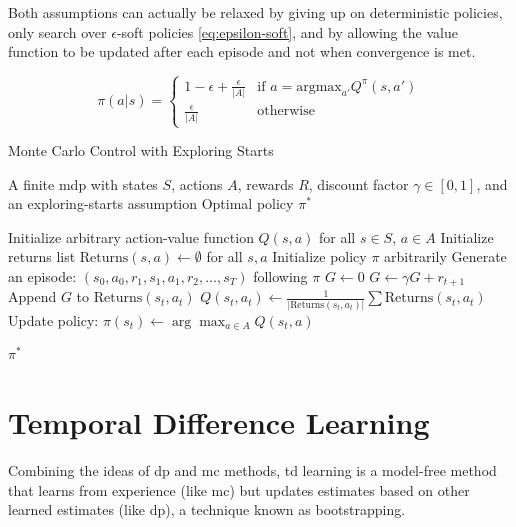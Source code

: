 Both assumptions can actually be relaxed by giving up on deterministic policies, only search over
$\epsilon$-soft policies \ref{eq:epsilon-soft}, and by allowing the value function to be updated after each episode and 
not when convergence is met.

\begin{equation}
    \pi(a|s)=\left\{
    \begin{array}{ll}
    1-\epsilon+\frac{\epsilon}{|A|} & \mbox{if $a=\mbox{argmax}_{a'}Q^{\pi}(s,a')$} \\
    \frac{\epsilon}{|A|} & \mbox{otherwise}
    \end{array}
    \right.
    \label{eq:epsilon-soft}
\end{equation}


\begin{algorithm}
    \caption{Monte Carlo Control with Exploring Starts}\label{alg:monte_carlo}
    \begin{algorithmic}
    \Require A finite \gls{mdp} with states $S$, actions $A$, rewards $R$, discount factor $\gamma \in [0,1]$, and an exploring-starts assumption
    \Ensure Optimal policy $\pi^*$
    
    \State Initialize arbitrary action-value function $Q(s, a)$ for all $s \in S$, $a \in A$
    \State Initialize returns list $\text{Returns}(s, a) \gets \emptyset$ for all $s, a$
    \State Initialize policy $\pi$ arbitrarily
    \Repeat
        \State Generate an episode: $(s_0, a_0, r_1, s_1, a_1, r_2, \dots, s_T)$ following $\pi$
        \State $G \gets 0$
          
            \State $G \gets \gamma G + r_{t+1}$
                \State Append $G$ to $\text{Returns}(s_t, a_t)$
                \State $Q(s_t, a_t) \gets \frac{1}{|\text{Returns}(s_t, a_t)|} \sum \text{Returns}(s_t, a_t)$
                \State Update policy: $\pi(s_t) \gets \arg\max_{a \in A} Q(s_t, a)$
            \EndIf
        \EndFor
    
    \State \Return $\pi^*$
    \end{algorithmic}
\end{algorithm}

\section{Temporal Difference Learning}
Combining the ideas of \gls{dp} and \gls{mc} methods, \gls{td} learning is a model-free method that 
learns from experience (like \gls{mc}) but updates estimates based on other learned estimates 
(like \gls{dp}), a technique known as bootstrapping.

